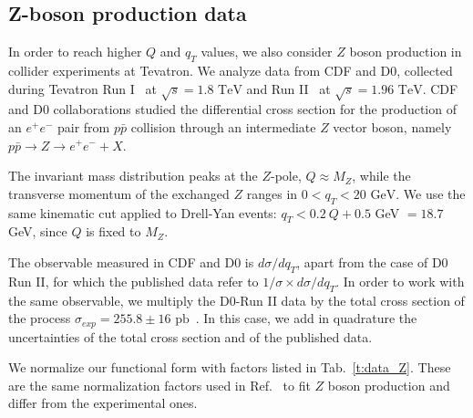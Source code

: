 \documentclass[aps,preprintnumbers,showpacs,nofootinbib,superscriptaddress,floatfix]{revtex4}
\begin{document}
\subsection{Z-boson production data}
\label{ss:zboson}

In order to reach higher $Q$ and $q_T$ values, we also consider $Z$ boson production in collider experiments at Tevatron. 
We analyze data from CDF and D0, collected during Tevatron Run I~\cite{Affolder:1999jh,Abbott:1999wk} at $\sqrt{s}=1.8\text{ TeV}$ and Run II~\cite{Aaltonen:2012fi,Abazov:2007ac} at $\sqrt{s}=1.96\text{ TeV}$. CDF and D0 collaborations studied the differential cross section for the production of an $e^+e^-$ pair from $p\bar{p}$ collision through an intermediate $Z$ vector boson, namely $p\bar{p}\rightarrow Z \rightarrow e^+e^- + X$. 

The invariant mass distribution peaks at the $Z$-pole, $Q \approx M_Z$, while the transverse momentum of the exchanged $Z$ ranges in $0< q_T < 20 \text{ GeV}$.
We use the same kinematic cut applied to Drell-Yan events:  $q_T < 0.2\ Q + 0.5$ GeV $ = 18.7$ GeV, since $Q$ is fixed to $M_Z$. 

The observable measured in CDF and D0 is $d\sigma /dq_T$,  apart from the case of D0 Run II, for which the published data refer to $1/\sigma \times d\sigma/dq_T$. In order to work with the same observable, we multiply the D0-Run II data by the total cross section of the process $\sigma_{exp} = 255.8 \pm 16 \text{ pb}$~\cite{Abulencia:2005ix}. In this case, we add in quadrature the uncertainties of the total cross section and of the published data. 

We normalize our functional form with factors listed in Tab.~\ref{t:data_Z}. These are the same normalization factors used in Ref.~\cite{DAlesio:2014mrz} to fit $Z$ boson production and differ from the experimental ones. 



\renewcommand{\tabcolsep}{0.4pc} %
\renewcommand{\arraystretch}{1.3} %
\end{document}
